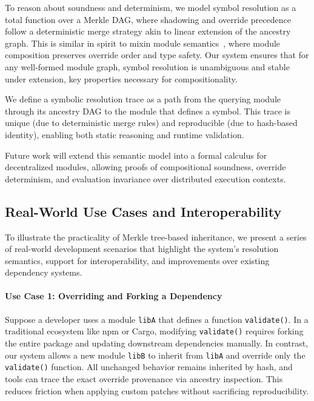 \documentclass[sigplan,screen]{acmart}
\begin{document}
To reason about soundness and determinism, we mo\-del symbol resolution as a total function over a Merkle DAG, where shadowing and override precedence follow a deterministic merge strategy akin to linear extension of the ancestry graph. This is similar in spirit to mixin module semantics~\cite{ancona2003foundations}, where module composition preserves override order and type safety. Our system ensures that for any well-formed module graph, symbol resolution is unambiguous and stable under extension, key properties necessary for compositionality.

We define a symbolic resolution trace as a path from the querying module through its ancestry DAG to the module that defines a symbol. This trace is unique (due to deterministic merge rules) and reproducible (due to hash-based identity), enabling both static reasoning and runtime validation.

Future work will extend this semantic model into a formal calculus for decentralized modules, allowing proofs of compositional soundness, override determinism, and evaluation invariance over distributed execution contexts.

\subsection{Real-World Use Cases and Interoperability}
\label{sec:use-cases}

To illustrate the practicality of Merkle tree-based inheritance, we present a series of real-world development scenarios that highlight the system's resolution semantics, support for interoperability, and improvements over existing dependency systems.

\paragraph{Use Case 1: Overriding and Forking a Dependency}

Suppose a developer uses a module \texttt{libA} that defines a function \texttt{validate()}. In a traditional ecosystem like npm or Cargo, modifying \texttt{validate()} requires forking the entire package and updating downstream dependencies manually. In contrast, our system allows a new module \texttt{libB} to inherit from \texttt{libA} and override only the \texttt{validate()} function. All unchanged behavior remains inherited by hash, and tools can trace the exact override provenance via ancestry inspection. This reduces friction when applying custom patches without sacrificing reproducibility.
\end{document}

